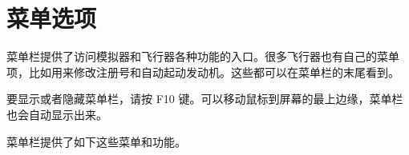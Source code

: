 \ifchinese
\section{菜单选项}
\fi

{}

\ifchinese
菜单栏提供了访问模拟器和飞行器各种功能的入口。很多飞行器也有自己的菜单项，比如用来修改注册号和自动起动发动机。这些都可以在菜单栏的末尾看到。

要显示或者隐藏菜单栏，请按 F10 键。可以移动鼠标到屏幕的最上边缘，菜单栏也会自动显示出来。

菜单栏提供了如下这些菜单和功能。
\fi

{}

